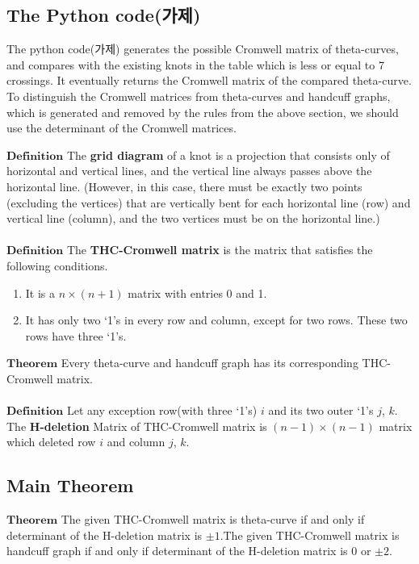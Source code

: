 \documentclass{article}
\theoremstyle{definition}
\begin{document}
\subsection{The Python code(가제)}
The python code(가제) generates the possible Cromwell matrix of theta-curves, and compares with the existing knots in the table which is less or equal to 7 crossings.
It eventually returns the Cromwell matrix of the compared theta-curve.
To distinguish the Cromwell matrices from theta-curves and handcuff graphs, which is generated and removed by the rules from the above section, we should use the determinant of the Cromwell matrices.

$\mathbf{Definition}$ The \textbf{grid diagram} of a knot is a projection that consists only of horizontal and vertical lines, and the vertical line always passes above the horizontal line. (However, in this case, there must be exactly two points (excluding the vertices) that are vertically bent for each horizontal line (row) and vertical line (column), and the two vertices must be on the horizontal line.) \\ \\
$\mathbf{Definition}$ The \textbf{THC-Cromwell matrix} is the matrix that satisfies the following conditions.
\begin{enumerate}
    \item It is a $n\times(n+1)$ matrix with entries 0 and 1.
    \item It has only two `1's in every row and column, except for two rows. These two rows have three `1's.
\end{enumerate}
$\mathbf{Theorem}$ Every theta-curve and handcuff graph has its corresponding THC-Cromwell matrix. \\ \\
$\mathbf{Definition}$ Let any exception row(with three `1's) $i$ and its two outer `1's $j$, $k$. The \textbf{H-deletion} Matrix of THC-Cromwell matrix is $(n-1)\times(n-1)$ matrix which deleted row $i$ and column $j$, $k$.\\

\subsection{Main Theorem}
$\mathbf{Theorem}$ The given THC-Cromwell matrix is theta-curve if and only if determinant of the H-deletion matrix is $\pm 1$.The given THC-Cromwell matrix is handcuff graph if and only if determinant of the H-deletion matrix is 0 or $\pm 2$.
\end{document}
